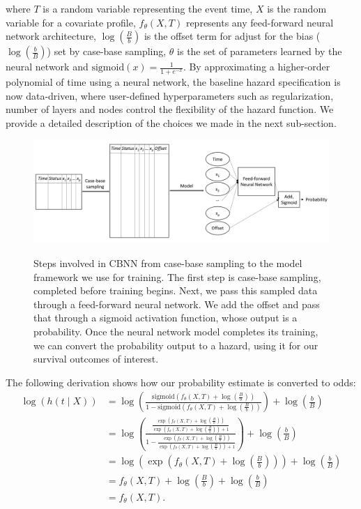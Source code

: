 \documentclass[APA,LATO1COL]{WileyNJD-v2}
\begin{document}
where \(T\) is a random variable representing the event time, \(X\) is
the random variable for a covariate profile, \(f_{\theta}(X, T)\)
represents any feed-forward neural network architecture,
\(\log\left(\frac{B}{b}\right)\) is the offset term for adjust for the bias
(\(\log\left(\frac{b}{B}\right)\)) set by case-base sampling,
\(\theta\) is the set of parameters learned by the neural network and
\(\mathrm{sigmoid}(x)=\frac{1}{1+e^{-x}}\). By approximating a
higher-order polynomial of time using a neural network, the baseline
hazard specification is now data-driven, where user-defined
hyperparameters such as regularization, number of layers and nodes
control the flexibility of the hazard function. We provide a detailed
description of the choices we made in the next sub-section.

\begin{figure}

{\centering \includegraphics[width=1\linewidth]{../figures/nnarch2}}

\caption{Steps involved in CBNN from case-base sampling to the model framework we use for training. The first step is case-base sampling, completed before training begins. Next, we pass this sampled data through a feed-forward neural network. We add the offset and pass that through a sigmoid activation function, whose output is a probability. Once the neural network model completes its training, we can convert the probability output to a hazard, using it for our survival outcomes of interest.}\label{fig:NNarch}
\end{figure}

The following derivation shows how our probability estimate is converted
to odds: \begin{align*}
 \log\left( h(t \mid X) \right) &= \log\left(\frac{\mathrm{sigmoid}\left(f_{\theta}(X, T) + \log\left(\frac{B}{b}\right)\right)}{1-\mathrm{sigmoid}\left(f_{\theta}(X, T) + \log\left(\frac{B}{b}\right)\right)}\right) + \log\left(\frac{b}{B}\right) \\
 &= \log\left( \frac{\frac{\exp\left(f_{\theta}(X, T) + \log\left(\frac{B}{b}\right)\right)}{\exp\left(f_{\theta}(X, T) + \log\left(\frac{B}{b}\right)\right)+1}}{1-\frac{\exp\left(f_{\theta}(X, T) + \log\left(\frac{B}{b}\right)\right)}{\exp\left(f_{\theta}(X, T) + \log\left(\frac{B}{b}\right)\right)+1}}\right) + \log\left(\frac{b}{B}\right) \\
 &= \log\left(\exp\left( f_{\theta}(X, T) + \log\left(\frac{B}{b}\right) \right) \right) + \log\left(\frac{b}{B}\right) \\
 &= f_{\theta}(X, T) + \log\left(\frac{B}{b}\right) + \log\left(\frac{b}{B}\right) \\
&= f_{\theta}(X, T). 
\end{align*}
\end{document}
